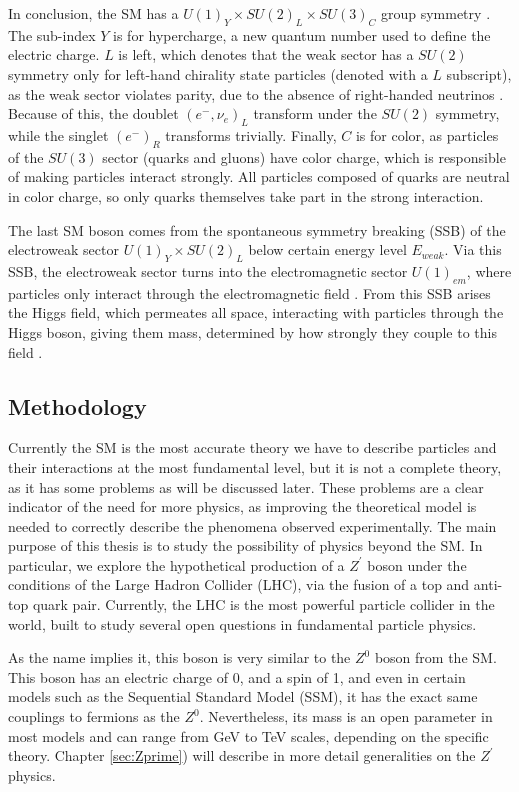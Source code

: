 In conclusion, the SM has a $U(1)_Y\times SU(2)_L\times SU(3)_C$ group symmetry \cite{Langacker}. The sub-index $Y$ is for hypercharge, a new quantum number used to define the electric charge. $L$ is left, which denotes that the weak sector has a $SU(2)$ symmetry only for left-hand chirality state particles \cite{Langacker}\cite{Nagashima} (denoted with a $L$ subscript), as the weak sector violates parity, due to the absence of right-handed neutrinos \cite{Hadjiivanov}. Because of this, the doublet $(e^-, \nu_e)_L$ transform under the $SU(2)$ symmetry, while the singlet $(e^-)_R$ transforms trivially. Finally, $C$ is for color, as particles of the $SU(3)$ sector (quarks and gluons) have color charge, which is responsible of making particles interact strongly. All particles composed of quarks are neutral in color charge, so only quarks themselves take part in the strong interaction. 

The last SM boson comes from the spontaneous symmetry breaking (SSB) of the electroweak sector $U(1)_Y\times SU(2)_L$ below certain energy level $E_{weak}$. Via this SSB, the electroweak sector turns into the electromagnetic sector $U(1)_{em}$, where particles only interact through the electromagnetic field \cite{Leike}. From this SSB arises the Higgs field, which permeates all space, interacting with particles through the Higgs boson, giving them mass, determined by how strongly they couple to this field \cite{Nagashima}.

\subsection{Methodology} \label{ssec:methodology}

Currently the SM is the most accurate theory we have to describe particles and their interactions at the most fundamental level, but it is not a complete theory, as it has some problems as will be discussed later. These problems are a clear indicator of the need for more physics, as improving the theoretical model is needed to correctly describe the phenomena observed experimentally. The main purpose of this thesis is to study the possibility of physics beyond the SM. In particular, we explore the hypothetical production of a $Z^{\prime}$ boson under the conditions of the Large Hadron Collider (LHC), via the fusion of a top and anti-top quark pair. Currently, the LHC is the most powerful particle collider in the world, built to study several open questions in fundamental particle physics.

As the name implies it, this boson is very similar to the $Z^0$ boson from the SM. This boson has an electric charge of 0, and a spin of 1, and even in certain models such as the Sequential Standard Model (SSM), it has the exact same couplings to fermions as the $Z^0$. Nevertheless, its mass is an open parameter in most models and can range from GeV to TeV scales, depending on the specific theory. Chapter \ref{sec:Zprime}) will describe in more detail generalities on the $Z^{\prime}$ physics.

